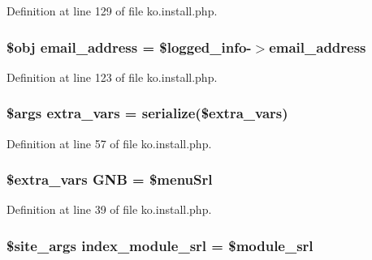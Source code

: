 Definition at line 129 of file ko.\+install.\+php.

\hypertarget{ko_8install_8php_a1dffea0d5ba8194f8ef01f414af0c831}{
\subsubsection[{email\+\_\+address}]{\setlength{\rightskip}{0pt plus 5cm}\$obj email\+\_\+address = \$logged\+\_\+info-\/$>$email\+\_\+address}}\label{ko_8install_8php_a1dffea0d5ba8194f8ef01f414af0c831}


Definition at line 123 of file ko.\+install.\+php.

\hypertarget{ko_8install_8php_ae1dcb37fc34a8f312d2e6abd6f806743}{
\subsubsection[{extra\+\_\+vars}]{\setlength{\rightskip}{0pt plus 5cm}\$args extra\+\_\+vars = serialize(\$extra\+\_\+vars)}}\label{ko_8install_8php_ae1dcb37fc34a8f312d2e6abd6f806743}


Definition at line 57 of file ko.\+install.\+php.

\hypertarget{ko_8install_8php_a9b1716b68fc04f3492448f38148dcbf5}{
\subsubsection[{G\+N\+B}]{\setlength{\rightskip}{0pt plus 5cm}\${\bf extra\+\_\+vars} G\+N\+B = \$menu\+Srl}}\label{ko_8install_8php_a9b1716b68fc04f3492448f38148dcbf5}


Definition at line 39 of file ko.\+install.\+php.

\hypertarget{ko_8install_8php_acd0b17bfe6d14c82871d73fa39c9c22d}{
\subsubsection[{index\+\_\+module\+\_\+srl}]{\setlength{\rightskip}{0pt plus 5cm}\$site\+\_\+args index\+\_\+module\+\_\+srl = \${\bf module\+\_\+srl}}}\label{ko_8install_8php_acd0b17bfe6d14c82871d73fa39c9c22d}


